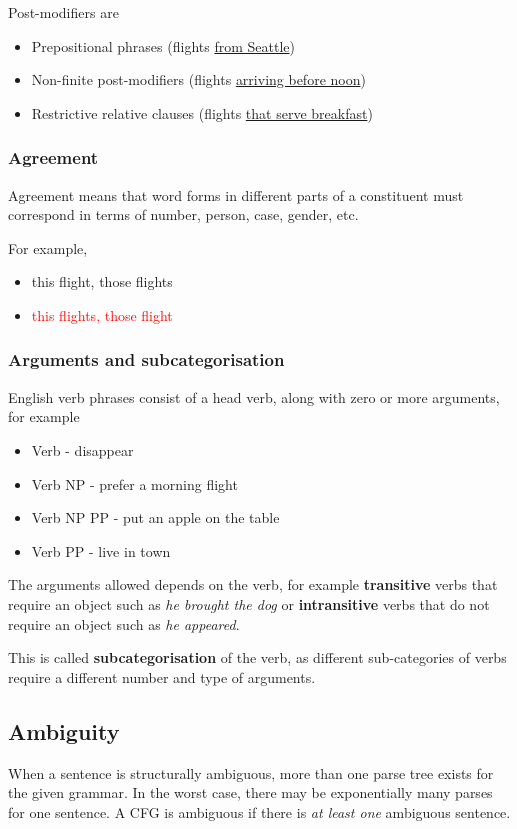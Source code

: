 \documentclass[Report.tex]{subfiles}
\begin{document}
Post-modifiers are
\begin{itemize}
\item Prepositional phrases (flights \underline{from Seattle})
\item Non-finite post-modifiers (flights \underline{arriving before noon})
\item Restrictive relative clauses (flights \underline{that serve breakfast})
\end{itemize}

\subsubsection{Agreement}
Agreement means that word forms in different parts of a constituent must
correspond in terms of number, person, case, gender, etc.

For example,
\begin{itemize}
\item this flight, those flights
\item \textcolor{red}{this flights, those flight}
\end{itemize}

\subsubsection{Arguments and subcategorisation}
English verb phrases consist of a head verb, along with zero or more arguments,
for example
\begin{itemize}
\item Verb - disappear
\item Verb NP - prefer a morning flight
\item Verb NP PP - put an apple on the table
\item Verb PP - live in town
\end{itemize}
The arguments allowed depends on the verb, for example \textbf{transitive} verbs
that require an object such as \textit{he brought the dog} or 
\textbf{intransitive} verbs that do not require an object such as \textit{he 
appeared}.

This is called \textbf{subcategorisation} of the verb, as different sub-categories
of verbs require a different number and type of arguments.

\subsection{Ambiguity}
When a sentence is structurally ambiguous, more than one parse tree exists for
the given grammar. In the worst case, there may be exponentially many parses
for one sentence. A CFG is ambiguous if there is \textit{at least one}
ambiguous sentence.
\end{document}
